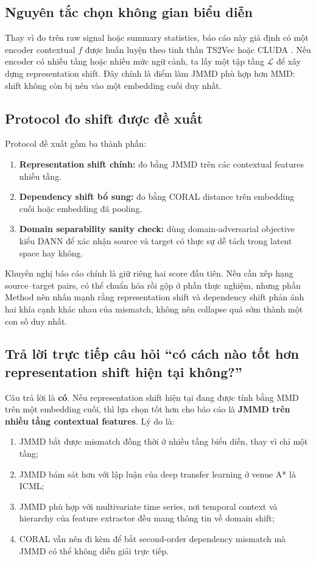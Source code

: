 \documentclass[a4paper]{article}
\begin{document}
\subsection{Nguyên tắc chọn không gian biểu diễn}

Thay vì đo trên raw signal hoặc summary statistics, báo cáo này giả định có một encoder contextual \(f\) được huấn luyện theo tinh thần TS2Vec \cite{ts2vec} hoặc CLUDA \cite{cluda}. Nếu encoder có nhiều tầng hoặc nhiều mức ngữ cảnh, ta lấy một tập tầng \(\mathcal{L}\) để xây dựng representation shift. Đây chính là điểm làm JMMD phù hợp hơn MMD: shift không còn bị nén vào một embedding cuối duy nhất.

\subsection{Protocol đo shift được đề xuất}

Protocol đề xuất gồm ba thành phần:
\begin{enumerate}[label=\arabic*.]
    \item \textbf{Representation shift chính:} đo bằng JMMD trên các contextual features nhiều tầng.
    \item \textbf{Dependency shift bổ sung:} đo bằng CORAL distance trên embedding cuối hoặc embedding đã pooling.
    \item \textbf{Domain separability sanity check:} dùng domain-adversarial objective kiểu DANN để xác nhận source và target có thực sự dễ tách trong latent space hay không.
\end{enumerate}

Khuyến nghị báo cáo chính là giữ riêng hai score đầu tiên. Nếu cần xếp hạng source--target pairs, có thể chuẩn hóa rồi gộp ở phần thực nghiệm, nhưng phần Method nên nhấn mạnh rằng representation shift và dependency shift phản ánh hai khía cạnh khác nhau của mismatch, không nên collapse quá sớm thành một con số duy nhất.

\subsection{Trả lời trực tiếp câu hỏi ``có cách nào tốt hơn representation shift hiện tại không?''}

Câu trả lời là \textbf{có}. Nếu representation shift hiện tại đang được tính bằng MMD trên một embedding cuối, thì lựa chọn tốt hơn cho báo cáo là \textbf{JMMD trên nhiều tầng contextual features}. Lý do là:
\begin{enumerate}[label=\arabic*.]
    \item JMMD bắt được mismatch đồng thời ở nhiều tầng biểu diễn, thay vì chỉ một tầng;
    \item JMMD bám sát hơn với lập luận của deep transfer learning ở venue A* là ICML;
    \item JMMD phù hợp với multivariate time series, nơi temporal context và hierarchy của feature extractor đều mang thông tin về domain shift;
    \item CORAL vẫn nên đi kèm để bắt second-order dependency mismatch mà JMMD có thể không diễn giải trực tiếp.
\end{enumerate}
\end{document}
